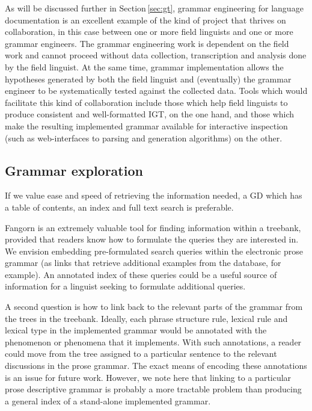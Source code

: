 \documentclass[12pt]{article}
\newcommand{\sref}[1]{Section$\,$\ref{#1}}
\begin{document}
As will be discussed further in \sref{sec:gt}, grammar engineering for
language documentation is an excellent example of the kind of project
that thrives on collaboration, in this case between one or more field
linguists and one or more grammar engineers.  The grammar engineering
work is dependent on the field work and cannot proceed without data
collection, transcription and analysis done by the field linguist.  At
the same time, grammar implementation allows the hypotheses generated
by both the field linguist and (eventually) the grammar engineer to be
systematically tested against the collected data.  Tools which would
facilitate this kind of collaboration include those which help field
linguists to produce consistent and well-formatted IGT, on the one
hand, and those which make the resulting implemented grammar available
for interactive inspection (such as web-interfaces to parsing and
generation algorithms) on the other.


\subsection{Grammar exploration}
\label{sub:grammar_exploration}

\begin{exe}
 If we value ease and speed of retrieving
the information needed, a GD which has a table of contents, an index
and full text search is preferable.
\end{exe}

Fangorn is an extremely valuable tool for finding information
within a treebank, provided that readers know how to formulate
the queries they are interested in.  We envision embedding pre-formulated
search queries within the electronic prose grammar (as links that
retrieve additional examples from the database, for example).  An
annotated index of these queries could be a useful source of information
for a linguist seeking to formulate additional queries.  

A second question is how to link back to the relevant parts of the
grammar from the trees in the treebank.  Ideally, each phrase
structure rule, lexical rule and lexical type in the implemented
grammar would be annotated with the phenomenon or phenomena that it
implements.  With such annotations, a reader could move from the tree
assigned to a particular sentence to the relevant discussions in the
prose grammar.  The exact means of encoding these annotations is an
issue for future work.  However, we note here that linking to a
particular prose descriptive grammar is probably a more tractable
problem than producing a general index of a stand-alone implemented
grammar.
\end{document}

